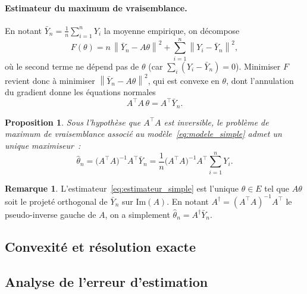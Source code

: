 \documentclass[12pt, a4paper]{article}
\newtheorem{proposition}[theorem]{Proposition}
\theoremstyle{definition}
\newtheorem{remark}[theorem]{Remarque}
\newcommand{\norm}[1]{\left\|#1\right\|}
\begin{document}
\paragraph{Estimateur du maximum de vraisemblance.}
En notant $\bar{Y}_n = \frac{1}{n}\sum_{i=1}^{n} Y_i$ la moyenne empirique, on
décompose
\[
    F(\theta)
    = n\,\norm{\bar{Y}_n - A\theta}^2
      + \sum_{i=1}^{n}\norm{Y_i - \bar{Y}_n}^2,
\]
où le second terme ne dépend pas de $\theta$ (car $\sum_i(Y_i - \bar{Y}_n) = 0$).
Minimiser $F$ revient donc à minimiser $\norm{\bar{Y}_n - A\theta}^2$, qui est convexe en $\theta$, dont
l'annulation du gradient donne les équations normales
\[
    A^\top A\,\theta = A^\top \bar{Y}_n.
\]

\begin{proposition}
Sous l'hypothèse que $A^\top A$ est inversible, le problème de maximum de
vraisemblance associé au modèle~\eqref{eq:modele_simple} admet un unique
maximiseur~:
\begin{equation}
    \hat{\theta}_n
    = \bigl(A^\top A\bigr)^{-1}A^\top \bar{Y}_n
    = \frac{1}{n}\bigl(A^\top A\bigr)^{-1}A^\top\sum_{i=1}^{n} Y_i.
    \label{eq:estimateur_simple}
\end{equation}
\end{proposition}

\begin{remark}
L'estimateur~\eqref{eq:estimateur_simple} est l'unique $\theta \in E$ tel que
$A\theta$ soit le projeté orthogonal de $\bar{Y}_n$ sur $\mathrm{Im}(A)$.
En notant $A^\dagger = (A^\top A)^{-1}A^\top$ le pseudo-inverse gauche de $A$,
on a simplement $\hat{\theta}_n = A^\dagger\bar{Y}_n$.
\end{remark}

\subsection{Convexité et résolution exacte}
\label{subsec:convexite_simple}

\subsection{Analyse de l'erreur d'estimation}
\label{subsec:erreur_simple}
\end{document}
